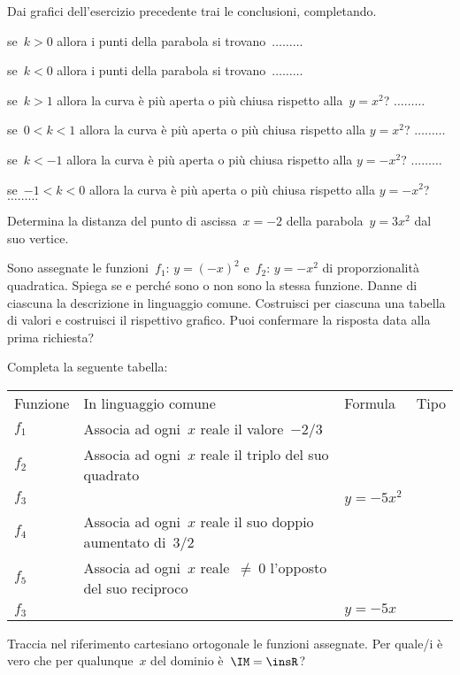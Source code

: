 \begin{esercizio}
\label{ese:D.54}
Dai grafici dell'esercizio precedente trai le conclusioni, completando.
\begin{enumeratea}
\item se~$k>0$ allora i punti della parabola si trovano~$\ldots \ldots \ldots$
\item se~$k<0$ allora i punti della parabola si trovano~$\ldots \ldots \ldots$
\item se~$k>1$ allora la curva è più aperta o più chiusa rispetto 
alla~$y=x^{2}$? $\ldots \ldots \ldots$
\item se~$0<k<1$ allora la curva è più aperta o più chiusa rispetto alla  
$y=x^{2}$? $\ldots \ldots \ldots$
\item se~$k<-1$ allora la curva è più aperta o più chiusa rispetto alla  
$y=-x^{2}$? $\ldots \ldots \ldots$
\item se~$-1<k<0$ allora la curva è più aperta o più chiusa rispetto alla  
$y=-x^{2}$? $\ldots \ldots \ldots$
\end{enumeratea}
\end{esercizio}

\begin{esercizio}
\label{ese:D.55}
Determina la distanza del punto di ascissa~$x=-2$ della parabola~$y=3x^{2}$ dal 
suo vertice.
\end{esercizio}

\begin{esercizio}
\label{ese:D.56}
Sono assegnate le funzioni~$f_{1}:\, y=(-x)^{2}$ e~$f_{2}:\, y=-x^{2}$ di 
proporzionalità quadratica.
Spiega se e perché sono o non sono la stessa funzione.
Danne di ciascuna la descrizione in linguaggio comune.
Costruisci per ciascuna una tabella di valori e costruisci il rispettivo 
grafico.
Puoi confermare la risposta data alla prima richiesta?
\end{esercizio}

\begin{esercizio}
\label{ese:D.57}
Completa la seguente tabella:
\begin{center}
 \begin{tabular}{llll}
  \toprule
  Funzione&In linguaggio comune&Formula&Tipo\\
  $f_1$&Associa ad ogni~$x$ reale il valore~$-2/3$& &\\
  $f_2$&Associa ad ogni~$x$ reale il triplo del suo quadrato& & \\
  $f_3$& &$y=-5x^2$& \\
  $f_4$&Associa ad ogni~$x$ reale il suo doppio aumentato di~$3/2$& & \\
  $f_5$&Associa ad ogni~$x$ reale~$\neq~0$ l'opposto del suo reciproco& & \\
  $f_3$& &$y=-5x$& \\
  \bottomrule
 \end{tabular}
\end{center}
Traccia nel riferimento cartesiano ortogonale le funzioni assegnate. Per quale/i 
è vero che per qualunque~$x$ del dominio è~$\IM=\insR$?
\end{esercizio}

